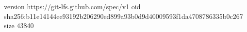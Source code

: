 version https://git-lfs.github.com/spec/v1
oid sha256:b11e14144ee93192b206290ed899a93b0d9d40009593f1da4708786335b0c267
size 43840
